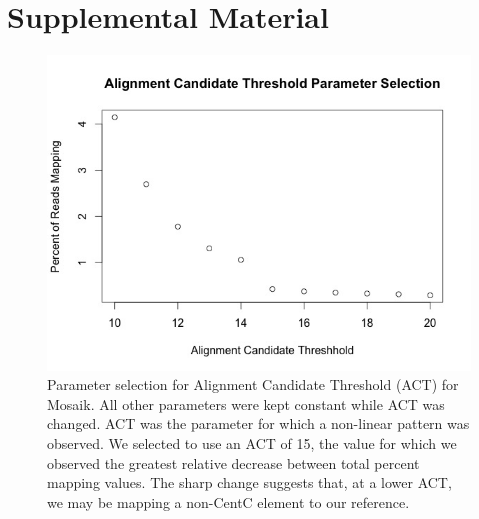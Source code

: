 
\newpage

\section*{Supplemental Material}

\begin{figure}[h!]
\includegraphics[width=1\textwidth]{Suppl_ACT_Seln.jpeg}
\setcounter{figure}{0}
\caption{Parameter selection for Alignment Candidate Threshold (ACT) for Mosaik.  All other parameters were kept constant while ACT was changed.  ACT was the parameter for which a non-linear pattern was observed.  We selected to use an ACT of 15, the value for which we observed the greatest relative decrease between total percent mapping values.  The sharp change suggests that, at a lower ACT, we may be mapping a non-CentC element to our reference.}
\label{Supp_MPS}    
\end{figure}

